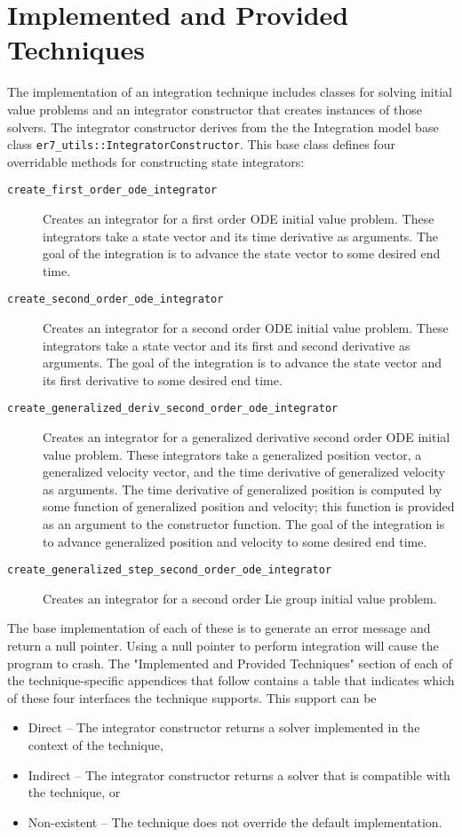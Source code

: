 \section{Implemented and Provided Techniques}

The implementation of an integration technique includes classes for solving
initial value problems and an integrator constructor that creates instances
of those solvers. The integrator constructor derives from the the \erseven
Integration model base class {\tt er7\_utils::IntegratorConstructor}.
This base class defines four overridable methods for constructing state
integrators:\begin{description}
\item[{\tt create\_first\_order\_ode\_integrator}]
Creates an integrator for a first order ODE initial value problem.
These integrators take a state vector and its time derivative as arguments.
The goal of the integration is to advance the state vector to some
desired end time.
\item[{\tt create\_second\_order\_ode\_integrator}]
Creates an integrator for a second order ODE initial value problem.
These integrators take a state vector and its first and second derivative
as arguments.
The goal of the integration is to advance the state vector and its first
derivative to some desired end time.
\item[{\tt create\_generalized\_deriv\_second\_order\_ode\_integrator}]
Creates an integrator for a generalized derivative second order ODE initial
value problem.
These integrators take a generalized position vector, a generalized velocity
vector, and the time derivative of generalized velocity as arguments.
The time derivative of generalized position is computed by some function
of generalized position and velocity; this function is provided as an
argument to the constructor function.
The goal of the integration is to advance generalized position and velocity
to some desired end time.
\item[{\tt create\_generalized\_step\_second\_order\_ode\_integrator}]
Creates an integrator for a second order Lie group initial value problem.
\end{description}

The base implementation of each of these is to generate an error message
and return a null pointer. Using a null pointer to perform integration will
cause the program to crash. The "Implemented and Provided Techniques" section
of each of the technique-specific appendices that follow contains a table that
indicates which of these four interfaces the technique supports.
This support can be
\begin{itemize}
\item Direct -- The integrator constructor returns a solver implemented in the
context of the technique,
\item Indirect -- The integrator constructor returns a solver that is
compatible with the technique, or
\item Non-existent -- The technique does not override the default
implementation.
\end{itemize}

